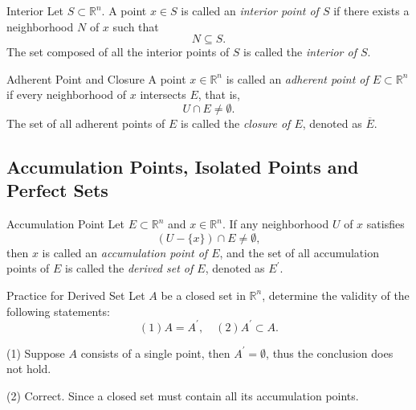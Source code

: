 \begin{definition}{Interior}{}
  Let $S \subset \mathbb{R}^n$.
  A point $x \in S$ is called an \emph{interior point of $S$} if there exists a
  neighborhood $N$ of $x$ such that
  \begin{equation}
    N \subseteq S.
  \end{equation}
  The set composed of all the interior points of $S$ is called the \emph{interior of $S$}.
\end{definition}

\begin{definition}{Adherent Point and Closure}{}
  A point $x \in \mathbb{R}^n$ is called an \emph{adherent point of $E \subset \mathbb{R}^n$} if
  every neighborhood of $x$ intersects $E$, that is,
  \begin{equation}
    U \cap E \neq \emptyset.
  \end{equation}
  The set of all adherent points of $E$ is called the \emph{closure of $E$}, denoted as $\overline{E}$.
\end{definition}



\subsection{Accumulation Points, Isolated Points and Perfect Sets}

\begin{definition}{Accumulation Point}{}
  Let $E \subset \mathbb{R}^n$ and $x \in \mathbb{R}^n$.
  If any neighborhood $U$ of $x$ satisfies
  \begin{equation}
    (U - \{x\}) \cap E \neq \emptyset,
  \end{equation}
  then $x$ is called an \emph{accumulation point of $E$},
  and the set of all accumulation points of $E$ is called the \emph{derived set
    of $E$}, denoted as $E^{\prime}$.
\end{definition}

\begin{example}{Practice for Derived Set}{}
  Let $A$ be a closed set in $\mathbb{R}^n$,
  determine the validity of the following statements:
  \begin{equation}
    (1) A = A^{\prime}, \quad
    (2) A^{\prime} \subset A.
  \end{equation}
\end{example}

\begin{solution}
  (1) Suppose $A$ consists of a single point,
  then $A^{\prime} = \emptyset$, thus the conclusion does not hold.

  (2) Correct. Since a closed set must contain all its accumulation points.
\end{solution}

